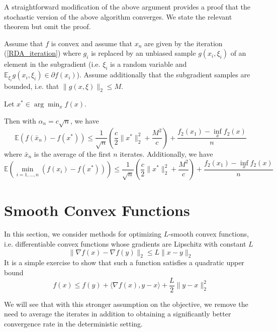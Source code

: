  A straightforward modification of the above argument provides a proof that the stochastic version of the above algorithm
 converges. We state the relevant theorem but omit the proof.
 \begin{theorem}
 Assume that $f$ is convex and assume that $x_n$ are given by the iteration (\ref{RDA_iteration}) where $g_i$ is replaced by
 an unbiased sample $g(x_i,\xi_i)$ of an element in the subgradient 
 (i.e. $\xi_i$ is a random variable and $\mathbb{E}_{\xi_i}g(x_i,\xi_i) \in \partial f(x_i)$). Assume additionally that the 
 subgradient samples are bounded, i.e. that $\|g(x,\xi)\|_2 \leq M$.
 
 Let $x^*\in \arg\min_x f(x)$.
 
 Then with $\alpha_n = c\sqrt{n}$, we have
 \begin{equation}
  \mathbb{E}(f(\bar{x}_n) - f(x^*)) \leq \frac{1}{\sqrt{n}}\left(\frac{c}{2}\|x^*\|_2^2 + \frac{M^2}{c}\right) + \frac{f_2(x_1) - \inf_x f_2(x)}{n}
 \end{equation}
 where $\bar{x}_n$ is the average of the first $n$ iterates. Additionally, we have
 \begin{equation}
  \mathbb{E}\left(\min_{i = 1,...,n} (f(x_i) - f(x^*))\right) \leq \frac{1}{\sqrt{n}}\left(\frac{c}{2}\|x^*\|_2^2 + \frac{M^2}{c}\right) + \frac{f_2(x_1) - \inf_x f_2(x)}{n}
 \end{equation}
 \end{theorem}

 

\section{Smooth Convex Functions}
In this section, we consider methods for optimizing $L$-smooth convex functions, i.e. differentiable convex functions
whose gradients are Lipschitz with constant $L$
\begin{equation}
 \|\nabla f(x) - \nabla f(y)\|_2 \leq L\|x - y\|_2
\end{equation}
It is a simple exercise to show that such a function satisfies a quadratic upper bound
\begin{equation}
 f(x)\leq f(y) + \langle\nabla f(x), y - x\rangle + \frac{L}{2}\|y - x\|_2^2
\end{equation}

We will see that with this stronger assumption on the objective, we remove the need to average the iterates in 
addition to obtaining a significantly better convergence rate in the deterministic setting.
